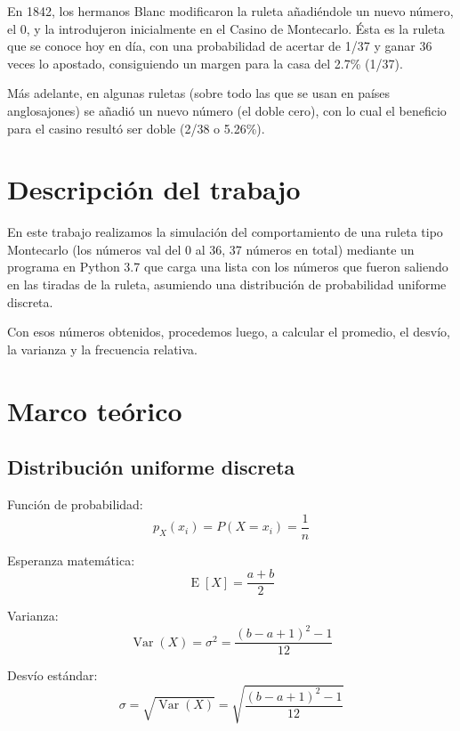 En 1842, los hermanos Blanc modificaron la ruleta añadiéndole un nuevo número, el 0, y la introdujeron inicialmente en el Casino de Montecarlo. Ésta es la ruleta que se conoce hoy en día, con una probabilidad de acertar de 1/37 y ganar 36 veces lo apostado, consiguiendo un margen para la casa del 2.7\% (1/37).

Más adelante, en algunas ruletas (sobre todo las que se usan en países anglosajones) se añadió un nuevo número (el doble cero), con lo cual el beneficio para el casino resultó ser doble (2/38 o 5.26\%).

\section{Descripción del trabajo}
\label{sec:headings}
En este trabajo realizamos la simulación del comportamiento de una ruleta tipo Montecarlo (los números val del 0 al 36, 37 números en total) mediante un programa en Python 3.7 que carga una lista con los números que fueron saliendo en las tiradas de la ruleta, asumiendo una distribución de probabilidad uniforme discreta.

Con esos números obtenidos, procedemos luego, a calcular el promedio, el desvío, la varianza y la frecuencia relativa.

\section{Marco teórico}
\subsection{Distribución uniforme discreta}
Función de probabilidad:
\begin{equation}
p_X(x_i) = P(X = x_i) = \frac{1}{n}
\end{equation}

Esperanza matemática:
\begin{equation}
\operatorname{E}[X] = \frac{a+b}{2}
\end{equation}

Varianza:
\begin{equation}
\operatorname{Var}(X) = \sigma^{2} = \frac{(b-a+1)^{2}-1}{12}
\end{equation}

Desvío estándar:
\begin{equation}
\sigma = \sqrt{\operatorname{Var}(X)} = \sqrt{\frac{(b-a+1)^{2}-1}{12}}
\end{equation}

